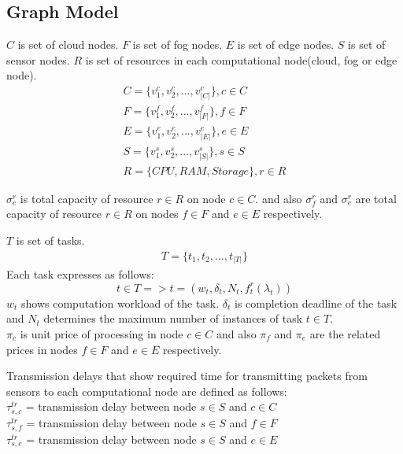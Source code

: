 \documentclass[conference]{IEEEtran}
\begin{document}
    \subsection{Graph Model}

    $C$ is set of cloud nodes.
    $F$ is set of fog nodes.
    $E$ is set of edge nodes.
    $S$ is set of sensor nodes.
    $R$ is set of resources in each computational node(cloud, fog or edge node).
    \begin{subequations}
      \begin{align}
          C = \{v_1^c, v_2^c, ..., v_{|C|}^c\} , c \in C\\
          F = \{v_1^f, v_2^f, ..., v_{|F|}^f\} , f \in F\\
          E = \{v_1^e, v_2^e, ..., v_{|E|}^e\} , e \in E\\
          S = \{v_1^s, v_2^s, ..., v_{|S|}^s\} , s \in S\\
          R = \{CPU, RAM, Storage\} , r \in R
      \end{align}
    \end{subequations}

    $\sigma_c^r$ is total capacity of resource $r \in R$ on node $c \in C$.
    and also $\sigma_f^r$ and $\sigma_e^r$ are total capacity of resource $r \in R$
    on nodes $f \in F$ and $e \in E$ respectively.

    $T$ is set of tasks.
    \begin{subequations}
      \begin{align}
          T = \{t_1, t_2, ..., t_{|T|}\}
      \end{align}
    \end{subequations}
    Each task expresses as follows:
    \begin{equation}
      t \in T => t = (w_t, \delta_t, N_t, f_t^r(\lambda_t))
    \end{equation}
    $w_t$ shows computation workload of the task.
    $\delta_t$ is completion deadline of the task and
    $N_t$ determines the maximum number of instances of task $t \in T$.\\

    $\pi_c$ is unit price of processing in node $c \in C$ and also $\pi_f$
    and $\pi_e$ are the related prices in nodes $f \in F$ and $e \in E$ respectively.

    Transmission delays that show required time for transmitting packets
    from sensors to each computational node are defined as follows:\\
    $\tau_{s,c}^{tr}$ = transmission delay between node $s \in S$ and $c \in C$\\
    $\tau_{s,f}^{tr}$ = transmission delay between node $s \in S$ and $f \in F$\\
    $\tau_{s,e}^{tr}$ = transmission delay between node $s \in S$ and $e \in E$
\end{document}
